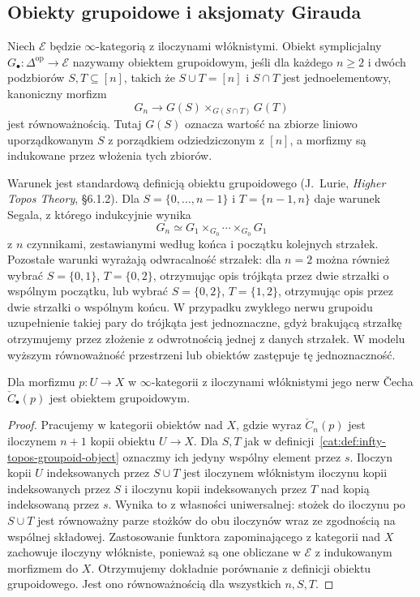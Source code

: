 \subsection{Obiekty grupoidowe i aksjomaty Girauda}

\begin{definicja}\label{cat:def:infty-topos-groupoid-object}
Niech $\mathcal E$ będzie $\infty$-kategorią z iloczynami włóknistymi. Obiekt symplicjalny $G_\bullet:\Delta^{\mathrm{op}}\to\mathcal E$ nazywamy obiektem grupoidowym, jeśli dla każdego $n\geq2$ i dwóch podzbiorów $S,T\subseteq[n]$, takich że $S\cup T=[n]$ i $S\cap T$ jest jednoelementowy, kanoniczny morfizm
\[
 G_n\longrightarrow G(S)\times_{G(S\cap T)}G(T)
\]
jest równoważnością. Tutaj $G(S)$ oznacza wartość na zbiorze liniowo uporządkowanym $S$ z porządkiem odziedziczonym z $[n]$, a morfizmy są indukowane przez włożenia tych zbiorów.
\end{definicja}

Warunek jest standardową definicją obiektu grupoidowego (J.~Lurie, \emph{Higher Topos Theory}, \S6.1.2). Dla $S=\{0,\ldots,n-1\}$ i $T=\{n-1,n\}$ daje warunek Segala, z którego indukcyjnie wynika
\[
 G_n\simeq G_1\times_{G_0}\cdots\times_{G_0}G_1
\]
z $n$ czynnikami, zestawianymi według końca i początku kolejnych strzałek. Pozostałe warunki wyrażają odwracalność strzałek: dla $n=2$ można również wybrać $S=\{0,1\}$, $T=\{0,2\}$, otrzymując opis trójkąta przez dwie strzałki o wspólnym początku, lub wybrać $S=\{0,2\}$, $T=\{1,2\}$, otrzymując opis przez dwie strzałki o wspólnym końcu. W przypadku zwykłego nerwu grupoidu uzupełnienie takiej pary do trójkąta jest jednoznaczne, gdyż brakującą strzałkę otrzymujemy przez złożenie z odwrotnością jednej z danych strzałek. W modelu wyższym równoważność przestrzeni lub obiektów zastępuje tę jednoznaczność.

\begin{stwierdzenie}\label{cat:prop:infty-cech-groupoid}
Dla morfizmu $p:U\to X$ w $\infty$-kategorii z iloczynami włóknistymi jego nerw Čecha $\check C_\bullet(p)$ jest obiektem grupoidowym.
\end{stwierdzenie}
\begin{proof}
Pracujemy w kategorii obiektów nad $X$, gdzie wyraz $\check C_n(p)$ jest iloczynem $n+1$ kopii obiektu $U\to X$. Dla $S,T$ jak w definicji~\ref{cat:def:infty-topos-groupoid-object} oznaczmy ich jedyny wspólny element przez $s$. Iloczyn kopii $U$ indeksowanych przez $S\cup T$ jest iloczynem włóknistym iloczynu kopii indeksowanych przez $S$ i iloczynu kopii indeksowanych przez $T$ nad kopią indeksowaną przez $s$. Wynika to z własności uniwersalnej: stożek do iloczynu po $S\cup T$ jest równoważny parze stożków do obu iloczynów wraz ze zgodnością na wspólnej składowej. Zastosowanie funktora zapominającego z kategorii nad $X$ zachowuje iloczyny włókniste, ponieważ są one obliczane w $\mathcal E$ z indukowanym morfizmem do $X$. Otrzymujemy dokładnie porównanie z definicji obiektu grupoidowego. Jest ono równoważnością dla wszystkich $n,S,T$.
\end{proof}

